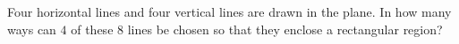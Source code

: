 Four horizontal lines and four vertical lines are drawn in the plane. In how many ways can $4$ of these $8$ lines be chosen so that they enclose a rectangular region?
